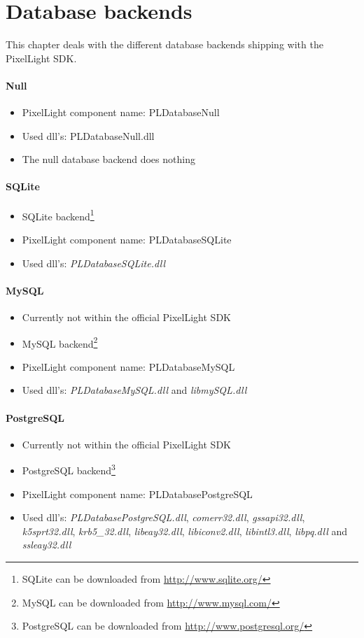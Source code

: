 \section{Database backends}
This chapter deals with the different database backends shipping with the PixelLight SDK.


\paragraph{Null}
\begin{itemize}
\item PixelLight component name: PLDatabaseNull
\item Used dll's: PLDatabaseNull.dll
\item The null database backend does nothing
\end{itemize}


\paragraph{SQLite}
\begin{itemize}
\item SQLite backend\footnote{SQLite can be downloaded from \url{http://www.sqlite.org/}}
\item PixelLight component name: PLDatabaseSQLite
\item Used dll's: \emph{PLDatabaseSQLite.dll}
\end{itemize}


\paragraph{MySQL}
\begin{itemize}
\item Currently not within the official PixelLight SDK
\item MySQL backend\footnote{MySQL can be downloaded from \url{http://www.mysql.com/}}
\item PixelLight component name: PLDatabaseMySQL
\item Used dll's: \emph{PLDatabaseMySQL.dll} and \emph{libmySQL.dll}
\end{itemize}


\paragraph{PostgreSQL}
\begin{itemize}
\item Currently not within the official PixelLight SDK
\item PostgreSQL backend\footnote{PostgreSQL can be downloaded from \url{http://www.postgresql.org/}}
\item PixelLight component name: PLDatabasePostgreSQL
\item Used dll's: \emph{PLDatabasePostgreSQL.dll}, \emph{comerr32.dll}, \emph{gssapi32.dll}, \emph{k5sprt32.dll}, \emph{krb5\_32.dll}, \emph{libeay32.dll}, \emph{libiconv2.dll}, \emph{libintl3.dll}, \emph{libpq.dll} and \emph{ssleay32.dll}
\end{itemize}
